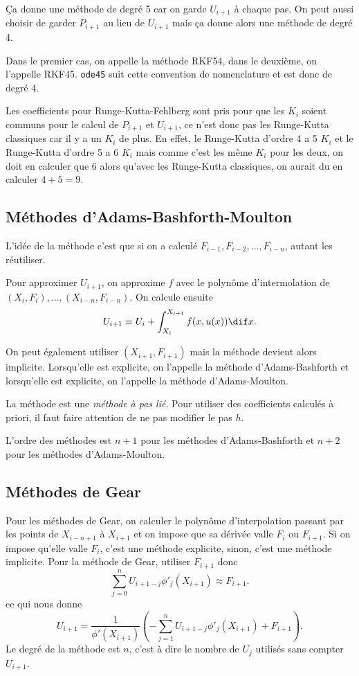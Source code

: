 Ça donne une méthode de degré 5 car on garde $U_{i+1}$ à chaque pas.
On peut aussi choisir de garder $P_{i+1}$ au lieu de $U_{i+1}$ mais ça donne
alors une méthode de degré 4.

Dans le premier cas, on appelle la méthode RKF54,
dans le deuxième, on l'appelle RKF45.
\lstinline|ode45| suit cette convention de nomenclature et est
donc de degré 4.

\begin{myrem}
  Les coefficients pour Runge-Kutta-Fehlberg sont pris pour que
  les $K_i$ soient communs pour le calcul de $P_{i+1}$ et $U_{i+1}$,
  ce n'est donc pas les Runge-Kutta classiques car il y a un $K_i$ de plus.
  En effet, le Runge-Kutta d'ordre 4 a 5 $K_i$ et le Runge-Kutta d'ordre
  5 a 6 $K_i$ mais comme c'est les même $K_i$ pour les deux, on doit
  en calculer que 6 alors qu'avec les Runge-Kutta classiques,
  on aurait du en calculer $4 + 5 = 9$.
\end{myrem}

\subsection{Méthodes d'Adams-Bashforth-Moulton}
L'idée de la méthode c'est que si on a calculé
$F_{i-1}, F_{i-2}, \ldots, F_{i-n}$,
autant les réutiliser.

Pour approximer $U_{i+1}$,
on approxime $f$ avec le polynôme d'intermolation de
$(X_i, F_i), \ldots, (X_{i-n},F_{i-n})$.
On calcule ensuite
\[ U_{i+1} = U_i + \int_{X_i}^{X_{i+1}}f(x,u(x))\dif x. \]

On peut également utiliser $(X_{i+1}, F_{i+1})$ mais la méthode devient
alors implicite.
Lorsqu'elle est explicite, on l'appelle la méthode
d'Adams-Bashforth et lorsqu'elle est explicite, on l'appelle
la méthode d'Adams-Moulton.

La méthode est une \emph{méthode à pas lié}.
Pour utiliser des coefficients calculés à priori,
il faut faire attention de ne pas modifier le pas $h$.

L'ordre des méthodes est $n+1$ pour les méthodes d'Adams-Bashforth et
$n+2$ pour les méthodes d'Adams-Moulton.

\subsection{Méthodes de Gear}
Pour les méthodes de Gear,
on calculer le polynôme d'interpolation passant par les points de
$X_{i-n+1}$ à $X_{i+1}$ et on impose que sa dérivée valle $F_i$ ou
$F_{i+1}$.
Si on impose qu'elle valle $F_i$, c'est une méthode explicite,
sinon, c'est une méthode implicite.
Pour la méthode de Gear, utiliser $F_{i+1}$ donc
\[ \sum_{j=0}^n U_{i+1-j}\phi'_j(X_{i+1}) \approx F_{i+1}. \]
ce qui nous donne
\[ U_{i+1} = \frac{1}{\phi'(X_{i+1})}
\left(-\sum_{j=1}^n U_{i+1-j}\phi'_j(X_{i+1}) + F_{i+1}\right). \]
Le degré de la méthode est $n$, c'est à dire le nombre de $U_j$ utilisés
sans compter $U_{i+1}$.

